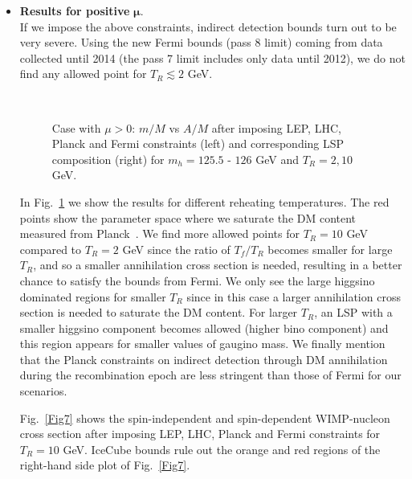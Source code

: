 \documentclass[12pt,a4paper]{book}
\begin{document}
\begin{itemize}
\item \textbf{Results for positive} $\mathbf{\mu}$.\\
If we impose the above constraints, indirect detection bounds turn out to be very severe. Using the new Fermi bounds (pass 8 limit) coming from data collected until 2014 (the pass 7 limit includes only data until 2012), we do not find any allowed point for $T_R\lesssim 2$ GeV.

\begin{figure}
\centering
{} \quad
{} \\
 \quad
{}
\caption{Case with $\mu>0$: $m/M$ vs $A/M$ after imposing LEP, LHC, Planck and Fermi constraints (left)
and corresponding LSP composition (right) for $m_h = 125.5$ - $126$ GeV and $T_R = 2, 10$ GeV.}
\label{Fig6}
\end{figure}

In Fig.~\ref{Fig6} we show the results for different reheating temperatures. The red points show the parameter space where we saturate the DM content measured from Planck~\cite{Ade:2015xua}. We find more allowed points for $T_R=10$ GeV compared to $T_R=2$ GeV since the ratio of $T_f/T_R$ becomes smaller for large $T_R$, and so a smaller annihilation cross section is needed, resulting in a better chance to satisfy the bounds from Fermi. We only see the large higgsino dominated regions for smaller $T_R$ since in this case a larger annihilation cross section is needed to saturate the DM content. For larger $T_R$, an LSP with a smaller higgsino component becomes allowed (higher bino component) and this region appears for smaller values of gaugino mass. We finally mention that the Planck constraints on indirect detection through DM annihilation during the recombination epoch are less stringent than those of Fermi for our scenarios.

Fig.~\ref{Fig7} shows the spin-independent and spin-dependent WIMP-nucleon cross section after imposing LEP, LHC, Planck and Fermi constraints for $T_R = 10$ GeV. IceCube bounds rule out the orange and red regions of the right-hand side plot of Fig.~\ref{Fig7}.


\end{itemize}
\end{document}
